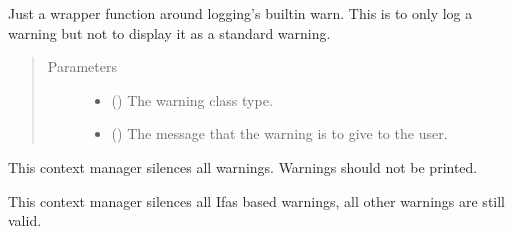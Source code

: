 \documentclass[letterpaper,10pt,english]{sphinxmanual}
\begin{document}
\begin{fulllineitems}
\label{\detokenize{docstrings/ifa_smeargle.core.error:ifa_smeargle.core.error.ifas_log_warning}}
Just a wrapper function around logging’s built\sphinxhyphen{}in warn.
This is to only log a warning but not to display it as a
standard warning.
\begin{quote}\begin{description}
\item[{Parameters}] \leavevmode\begin{itemize}
\item {} 
 () \textendash{} The warning class type.

\item {} 
 () \textendash{} The message that the warning is to give to the user.

\end{itemize}

\end{description}\end{quote}

\end{fulllineitems}


\begin{fulllineitems}
\label{\detokenize{docstrings/ifa_smeargle.core.error:ifa_smeargle.core.error.ifas_silence_all_warnings}}
This context manager silences all warnings. Warnings should
not be printed.

\end{fulllineitems}


\begin{fulllineitems}
\label{\detokenize{docstrings/ifa_smeargle.core.error:ifa_smeargle.core.error.ifas_silence_ifas_warnings}}
This context manager silences all Ifas based warnings, all
other warnings are still valid.

\end{fulllineitems}
\end{document}
